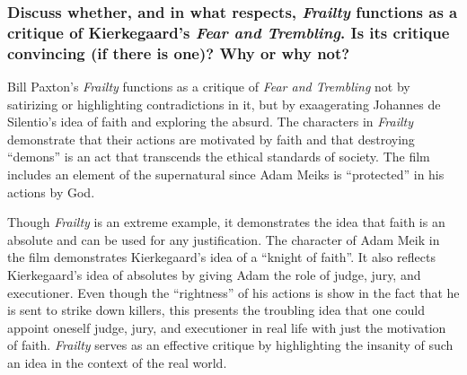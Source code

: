 \documentclass[letterpaper, 12pt]{article}
\begin{document}
\subsubsection*{Discuss whether, and in what respects, \textit{Frailty} functions as a critique of Kierkegaard's \textit{Fear and Trembling}. Is its critique convincing (if there is one)? Why or why not?}
Bill Paxton's \textit{Frailty} functions as a critique of \textit{Fear and Trembling} not by satirizing or highlighting contradictions in it, but by exaagerating Johannes de Silentio's idea of faith and exploring the absurd. The characters in \textit{Frailty} demonstrate that their actions are motivated by faith and that destroying ``demons'' is an act that transcends the ethical standards of society. The film includes an element of the supernatural since Adam Meiks is ``protected'' in his actions by God. \par
Though \textit{Frailty} is an extreme example, it demonstrates the idea that faith is an absolute and can be used for any justification. The character of Adam Meik in the film demonstrates Kierkegaard's idea of a ``knight of faith''. It also reflects Kierkegaard's idea of absolutes by giving Adam the role of judge, jury, and executioner. Even though the ``rightness'' of his actions is show in the fact that he is sent to strike down killers, this presents the troubling idea that one could appoint oneself judge, jury, and executioner in real life with just the motivation of faith. \textit{Frailty} serves as an effective critique by highlighting the insanity of such an idea in the context of the real world.
\end{document}
